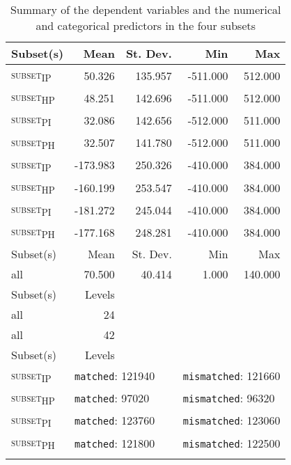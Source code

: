 \begin{table}[H]\fontsize{10}{11}
\caption{Summary of the dependent variables and the numerical and categorical predictors in the four subsets}
\label{tab:8.5}
\centering
\begin{tabular}{lrrrr}
\lsptoprule
Subset(s) & Mean              & St. Dev.           & Min      & Max      \\
\midrule
\textsc{subset\textsubscript{IP}}  & 50.326            & 135.957            & -511.000 & 512.000  \\
\textsc{subset\textsubscript{HP}}  & 48.251            & 142.696            & -511.000 & 512.000  \\
\textsc{subset\textsubscript{PI}}  & 32.086            & 142.656            & -512.000 & 511.000  \\
\textsc{subset\textsubscript{PH}}  & 32.507            & 141.780            & -512.000 & 511.000  \\
\textsc{subset\textsubscript{IP}}  & -173.983          & 250.326            & -410.000 & 384.000  \\
\textsc{subset\textsubscript{HP}}  & -160.199          & 253.547            & -410.000 & 384.000  \\
\textsc{subset\textsubscript{PI}}  & -181.272          & 245.044            & -410.000 & 384.000  \\
\textsc{subset\textsubscript{PH}}  & -177.168          & 248.281            & -410.000 & 384.000  \\
\midrule
Subset(s) & Mean              & St. Dev.           & Min      & Max      \\
\midrule
all       & 70.500            & 40.414             & 1.000    & 140.000  \\
\midrule
Subset(s) & \multirow{1}{*}{Levels}            & ~                  & ~        & ~        \\
\midrule
all       & \multirow{1}{*}{24}                & ~                  & ~        & ~        \\
all       & \multirow{1}{*}{42}                & ~                  & ~        & ~        \\
\midrule
Subset(s) & \multirow{1}{*}{Levels}            &                    &          &          \\
\midrule
\textsc{subset\textsubscript{IP}}  & \multicolumn{2}{l}{\texttt{matched}: 121940} & \multicolumn{2}{l}{\texttt{mismatched}: 121660}    \\

\textsc{subset\textsubscript{HP}}  & \multicolumn{2}{l}{\texttt{matched}: 97020} & \multicolumn{2}{l}{\texttt{mismatched}: 96320}    \\

\textsc{subset\textsubscript{PI}}  & \multicolumn{2}{l}{\texttt{matched}: 123760} & \multicolumn{2}{l}{\texttt{mismatched}: 123060}    \\

\textsc{subset\textsubscript{PH}}  & \multicolumn{2}{l}{\texttt{matched}: 121800} & \multicolumn{2}{l}{\texttt{mismatched}: 122500}    \\
\lspbottomrule
\end{tabular}
\end{table}




